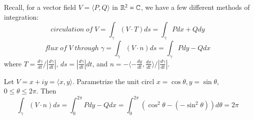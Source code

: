 Recall, for a vector field $V = \langle P,Q\rangle$ in $\mathbb R^2 = \mathbb C$, we have a few different methods of integration: \begin{equation*}
    circulation\;of\;V = \int_{\gamma}(V\cdot T)ds = \int_{\gamma}Pdx+Qdy
\end{equation*}
\begin{equation*}
    flux\;of\;V\;through\;\gamma = \int_{\gamma}(V\cdot n)ds = \int_{\gamma}Pdy-Qdx
\end{equation*}
where $T = \frac{d\gamma}{dt}/\left|\frac{d\gamma}{dt}\right|$, $ds = \left|\frac{d\gamma}{dt}\right|dt$, and $n = -\langle -\frac{dy}{dt},\frac{dx}{dt}\rangle/\left|\frac{d\gamma}{dt}\right|$.

\begin{example}
    Let $V = x+iy = \langle x,y\rangle$. Parametrize the unit circl $x = \cos\theta, y = \sin\theta$, $0 \leq \theta \leq 2\pi$. Then 
    \begin{equation*}
        \int_{\gamma}(V\cdot n)ds = \int_0^{2\pi}Pdy-Qdx = \int_0^{2\pi}(\cos^2\theta-(-\sin^2\theta))d\theta = 2\pi
    \end{equation*}
\end{example}

